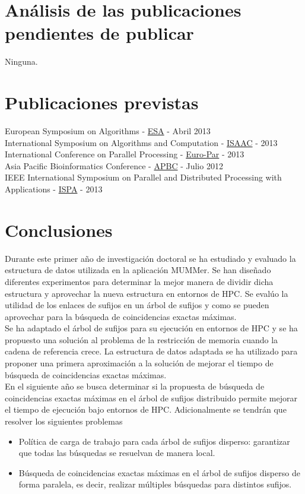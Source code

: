 \documentclass[11pt,a4paper,english]{article}
\begin{document}
\section{Análisis de las publicaciones pendientes de publicar}
\noindent
Ninguna.
\section{Publicaciones previstas}
European Symposium on Algorithms - \href{http://esa-symposium.org/}{ESA} - Abril 2013\\
International Symposium on Algorithms and Computation - \href{http://www.is.titech.ac.jp/isaac11/}{ISAAC} - 2013\\
International Conference on Parallel Processing - \href{http://www.grs-sim.de/news-events/news-archive/euro-par-2013.html}{Euro-Par} - 2013\\
Asia Pacific Bioinformatics Conference - \href{http://www.bioinformatics.ubc.ca/2012/01/30/apbc2013-the-eleventh-asia-pacific-bioinformatics-conference/}{APBC} - Julio 2012\\
IEEE International Symposium on Parallel and Distributed Processing with Applications - \href{http://www.arcos.inf.uc3m.es/ispa12/}{ISPA} - 2013

\section{Conclusiones}
\indent
Durante este primer año de investigación doctoral se ha estudiado y evaluado la estructura de datos utilizada en la aplicación MUMMer.
Se han diseñado diferentes experimentos para determinar la mejor manera de dividir dicha estructura y aprovechar la nueva estructura
en entornos de HPC. Se evalúo la utilidad de los enlaces de sufijos en un árbol de sufijos y como se pueden aprovechar para la 
búsqueda de coincidencias exactas máximas.\\
\indent
Se ha adaptado el árbol de sufijos para su ejecución en entornos de HPC y se ha propuesto una solución al problema de  la restricción
de memoria cuando la cadena de referencia crece. La estructura de datos adaptada se ha utilizado para proponer una primera aproximación a la 
solución de mejorar el tiempo de búsqueda de coincidencias exactas máximas.\\
\indent
En el siguiente año se busca determinar si la propuesta de búsqueda de coincidencias exactas máximas en el árbol de sufijos distribuido 
permite mejorar el tiempo de ejecución bajo entornos de HPC. Adicionalmente se tendrán que resolver los siguientes problemas
\begin{itemize}
  \item Política de carga de trabajo para cada árbol de sufijos disperso: garantizar que todas las búsquedas se resuelvan de manera local.
  \item Búsqueda de coincidencias exactas máximas en el árbol de sufijos disperso de forma paralela, es decir, realizar múltiples búsquedas
    para distintos sufijos. 
\end{itemize}
 
	
\end{document}
